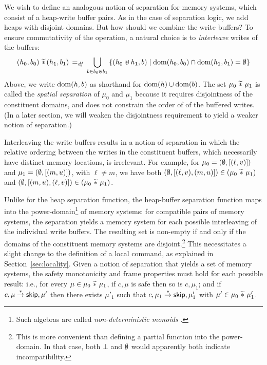 \documentclass[11pt]{report}         %
\begin{document}
We wish to define an analogous notion of separation for memory systems, which consist of a heap-write buffer pairs. As in the case of separation logic, we add heaps with disjoint domains. But how should we combine the write buffers? To ensure commutativity of the operation, a natural choice is to \emph{interleave} writes of the buffers: \[ (h_0,b_0) \operatorname{\,\widetilde{\ast}\,} (h_1,b_1) \operatorname{\;=_{\mathit{df}}\;} \bigcup_{b \in b_0 \uplus b_1}
    \left\lbrace (h_0 \uplus h_1, b) \mid \operatorname{\mathrm{dom}}(h_0,b_0) \cap \operatorname{\mathrm{dom}}(h_1,b_1) = \operatorname{\emptyset} \right\rbrace
\] Above, we write $\operatorname{\mathrm{dom}}(h,b)$ as shorthand for $\operatorname{\mathrm{dom}}(h) \cup \operatorname{\mathrm{dom}}(b)$. The set $\mu_0 \operatorname{\,\widetilde{\ast}\,} \mu_1$ is called the \emph{spatial separation} of $\mu_0$ and $\mu_1$ because it requires disjointness of the constituent domains, and does not constrain the order of of the buffered writes. (In a later section, we will weaken the disjointness requirement to yield a weaker notion of separation.)

Interleaving the write buffers results in a notion of separation in which the relative ordering between the writes in the constituent buffers, which necessarily have distinct memory locations, is irrelevant. For example, for $\mu_0 = (\operatorname{\emptyset},\left[(\ell,v)\right])$ and $\mu_1 = (\operatorname{\emptyset},\left[(m,u)\right])$, with $\ell \neq m$, we have both $(\operatorname{\emptyset},\left[(\ell,v),(m,u)\right]) \in (\mu_0 \operatorname{\,\widetilde{\ast}\,} \mu_1)$ and $(\operatorname{\emptyset},\left[(m,u),(\ell,v)\right]) \in (\mu_0 \operatorname{\,\widetilde{\ast}\,} \mu_1)$. 

Unlike for the heap separation function, the heap-buffer separation function maps into the power-domain\footnote{Such algebras are called \emph{non-deterministic monoids} \cite{DBLP:conf/fsttcs/GalmicheL06}.} of memory systems: for compatible pairs of memory systems, the separation yields a memory system for each possible interleaving of the individual write buffers. The resulting set is non-empty if and only if the domains of the constituent memory systems are disjoint.\footnote{This is more convenient than defining a partial function into the power-domain. In that case, both $\bot$ and $\operatorname{\emptyset}$ would apparently both indicate incompatibility.} This necessitates a slight change to the definition of a local command, as explained in Section~\ref{sec:locality}. Given a notion of separation that yields a set of memory systems, the safety monotonicity and frame properties must hold for each possible result: i.e., for every $\mu \in \mu_0 \operatorname{\,\widetilde{\ast}\,} \mu_1$, if $c,\mu$ is safe then so is $c,\mu_1$; and if $c,\mu \stackrel{\ast}{\rightarrow} \operatorname{\mathsf{skip}},\mu'$ then there exists $\mu'_1$ such that $c,\mu_1 \stackrel{\ast}{\rightarrow} \operatorname{\mathsf{skip}},\mu'_1$ with $\mu' \in \mu_0 \operatorname{\,\widetilde{\ast}\,} \mu'_1$. 
\end{document}
